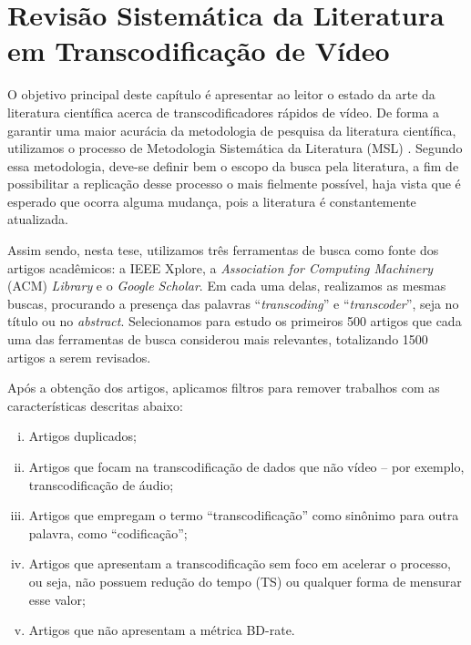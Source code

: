 \chapter{Revisão Sistemática da Literatura em Transcodificação de Vídeo}
\label{cap:3}

O objetivo principal deste capítulo é apresentar ao leitor o estado da arte da literatura científica acerca de transcodificadores rápidos de vídeo. De forma a garantir uma maior acurácia da metodologia de pesquisa da literatura científica, utilizamos o processo de Metodologia Sistemática da Literatura (MSL) \cite{bib:msl}. Segundo essa metodologia, deve-se definir bem o escopo da busca pela literatura, a fim de possibilitar a replicação desse processo o mais fielmente possível, haja vista que é esperado que ocorra alguma mudança, pois a literatura é constantemente atualizada.

Assim sendo, nesta tese, utilizamos três ferramentas de busca como fonte dos artigos acadêmicos: a IEEE Xplore, a \textit{Association for Computing Machinery} (ACM) \textit{Library} e o \textit{Google Scholar}. Em cada uma delas, realizamos as mesmas buscas, procurando a presença das palavras ``\textit{transcoding}'' e ``\textit{transcoder}'', seja no título ou no \textit{abstract}. Selecionamos para estudo os primeiros 500 artigos que cada uma das ferramentas de busca considerou mais relevantes, totalizando 1500 artigos a serem revisados.

Após a obtenção dos artigos, aplicamos filtros para remover trabalhos com as características descritas abaixo: 

\begin{enumerate}[i.]
    \item Artigos duplicados;

    \item Artigos que focam na transcodificação de dados que não vídeo – por exemplo, transcodificação de áudio;

    \item Artigos que empregam o termo ``transcodificação'' como sinônimo para outra palavra, como ``codificação'';

    \item Artigos que apresentam a transcodificação sem foco em acelerar o processo, ou seja, não possuem redução do tempo (TS) ou qualquer forma de mensurar esse valor;

    \item Artigos que não apresentam a métrica BD-rate.
\end{enumerate}

